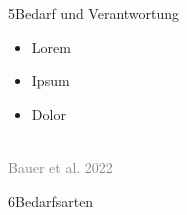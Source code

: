 \documentclass[xcolor=table,9pt,aspectratio=169]{beamer}
\begin{document}
\begin{frame}{\vspace*{10mm}5\hspace*{1em}Bedarf und Verantwortung}
\begin{multicols}{2}
\begin{itemize}
   \item Lorem
   \item Ipsum
   \item Dolor
\end{itemize}
\vfill

\begin{center}
   \vspace{1cm}
   \\
   \footnotesize{\textcolor{gray}{Bauer et al. 2022}}
   \vspace{1cm}
\end{center}
\end{multicols}
\end{frame}


\begin{frame}
\begin{overlayarea}{\textwidth}{0.81\paperheight}{
   \vspace*{11mm}
   \textcolor{uolblue}
   {6\hspace*{1em}Bedarfsarten}
}
\vspace*{7mm}
\end{overlayarea}
\end{frame}
\end{document}
